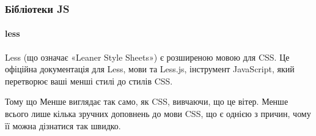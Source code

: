 \subsubsection{Бібліотеки JS}

\paragraph{less}

Less (що означає «Leaner Style Sheets») є розширеною мовою для CSS. Це офіційна документація для Less, мови та Less.js, інструмент JavaScript, який перетворює ваші менші стилі до стилів CSS.

Тому що Менше виглядає так само, як CSS, вивчаючи, що це вітер. Менше всього лише кілька зручних доповнень до мови CSS, що є однією з причин, чому її можна дізнатися так швидко.

